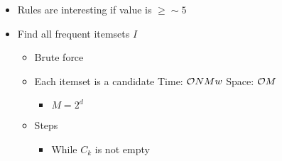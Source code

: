 \begin{itemize}
\begin{itemize}
\begin{itemize}
                    \item Rules are interesting if value is $\ge \sim 5$
                \end{itemize}
        \end{itemize}
        \begin{itemize}
            \item Find all frequent itemsets $I$
                \begin{itemize}
                        \begin{itemize}
                            \item Brute force
                            \item Each itemset is a candidate
                            \icon Time: $\mathcal{O}{NMw}$
                            \icon Space: $\mathcal{O}{M}$
                                \begin{itemize}
                                    \item $M = 2^d$
                                \end{itemize}
                        \end{itemize}
                        \begin{itemize}
                                \begin{itemize}
                                    \item If itemset is frequent, then all of its subsets must also be frequent
                                    \item If itemset is not frequent, then no superset will be frequent
                                    \item Support of itemset never exceeds the support the its subsets
                                \end{itemize}
                             candidate itemset of size $k$
                             frequent itemset of size $k$
                            \item Steps
                                \begin{itemize}
                                     $k = 1, C_1 =$ all items
                                    \item While $C_k$ is not empty
                                        \begin{itemize}

\end{itemize}
\end{itemize}
\end{itemize}
\end{itemize}
\end{itemize}
\end{itemize}
